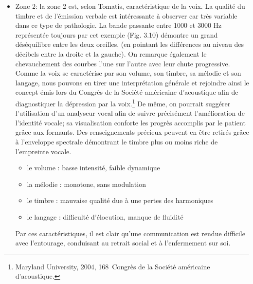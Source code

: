 \begin{itemize}
	
	\item Zone 2: la zone 2 est, selon Tomatis, caractéristique de la voix. 
	La qualité du timbre et de l'émission verbale est intéressante à observer car très variable dans ce type 
	de pathologie. La bande passante entre 1000 et 3000 Hz représentée  toujours par cet 
	exemple  (Fig. 3.10) démontre  un 
	grand déséquilibre entre les deux oreilles, (en pointant 
	les différences au niveau des décibels entre la droite et la gauche). On remarque également  le 
	chevauchement des courbes l'une sur l'autre avec leur chute progressive. 
		\\
		Comme la voix se caractérise par son volume, son timbre, sa mélodie et son
	langage, nous pouvons en tirer une interprétation générale et  rejoindre ainsi le concept émis lors du 
	Congrès de la Société
	américaine d'acoustique \autocite{le_service_metronews}
	afin de diagnostiquer la
	dépression par la voix.\footnote{Maryland University, 2004, 168\ieme\ Congrès de la Société
		américaine d'acoustique.}
	De même, on pourrait suggérer l'utilisation d'un analyseur vocal afin de suivre précisément 
	l'amélioration 
	de
	l'identité vocale; sa visualisation conforte les progrès accomplis par le patient grâce aux
	formants. Des renseignements précieux peuvent  en être retirés grâce à  l'enveloppe 
	spectrale 
	démontrant 
	le timbre plus ou moins riche
	de l'empreinte vocale.%
	\begin{itemize}
		\item le volume : basse intensité, faible dynamique
		\item la mélodie : monotone, sans modulation
		\item le timbre : mauvaise qualité due à une pertes des harmoniques
		\item le langage : difficulté d'élocution, manque de fluidité
	\end{itemize}
	Par ces caractéristiques, il est clair qu'une communication est rendue difficile avec l'entourage, 
conduisant au retrait social et à l'enfermement sur soi.


\end{itemize}
